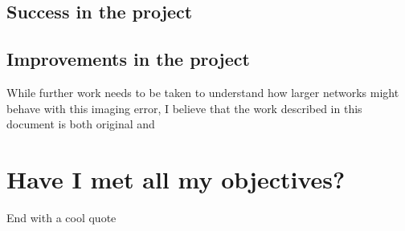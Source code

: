 
\subsection{Success in the project}

\subsection{Improvements in the project}

While further work needs to be taken to understand how larger networks
might behave with this imaging error, I believe that the work described in this
document is both original and  

\section{Have I met all my objectives?}

End with a cool quote

